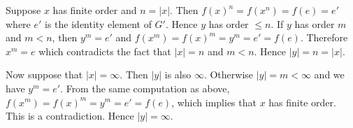 Suppose $x$ has finite order and $n = |x|$.
Then $f(x)^n = f(x^n) = f(e) = e'$ where $e'$ is the identity element of $G'$.
Hence $y$ has order $\leq n$.
If $y$ has order $m$ and $m < n$, then $y^m = e'$
and $f(x^m) = f(x)^m = y^m = e' = f(e)$.
Therefore $x^m = e$ which contradicts the fact that $|x| = n$ and $m < n$.
Hence $|y| = n = |x|$.

Now suppose that $|x| = \infty$.
Then $|y|$ is also $\infty$.
Otherwise $|y| = m < \infty$ and we have
$y^m = e'$.
From the same computation as above,
$f(x^m) = f(x)^m = y^m = e' = f(e)$,
which implies that $x$ has finite order.
This is a contradiction.
Hence $|y| = \infty$.
    

